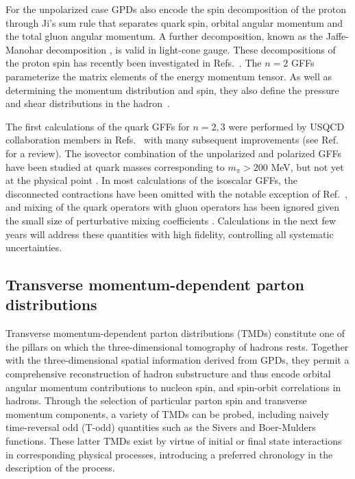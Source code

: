 For the unpolarized case
GPDs also encode the spin decomposition of the proton through Ji's sum rule \cite{Ji:1996ek} that separates quark spin, orbital angular momentum and the total gluon angular momentum. 
A further decomposition, known as the Jaffe-Manohar decomposition \cite{Jaffe:1989jz}, is valid in light-cone gauge. These decompositions of the proton spin has recently been investigated in Refs.~\cite{Yang:2016plb,Alexandrou:2017oeh}.
The $n=2$ GFFs  parameterize the matrix elements of the energy momentum tensor. As well as determining the momentum distribution and spin, they 
also define the pressure and shear distributions in the hadron~\cite{Polyakov:2018zvc}.

The first calculations of the quark GFFs for $n=2,3$ were performed by USQCD collaboration members in Refs.~\cite{Hagler:2003jd} with many subsequent improvements (see Ref.~\cite{Hagler:2009mb} for a review). The isovector combination of the unpolarized and polarized GFFs have been studied at quark masses corresponding to $m_\pi>200$ MeV, but not yet at the physical point \cite{Syritsyn:2011vk,Bali:2013dpa,Hagler:2007xi,Bratt:2010jn,Sternbeck:2012rw,Brommel:2007sb,Gockeler:2003jfa,Alexandrou:2011nr}. In most calculations of the isoscalar GFFs, the disconnected contractions have been omitted with the notable exception of Ref.~\cite{Deka:2013zha}, and mixing of the quark operators with gluon operators has been ignored given the small size of perturbative mixing coefficients \cite{Alexandrou:2016ekb}.  Calculations in the next few years will address these quantities with high fidelity, controlling all systematic uncertainties.

\subsection{Transverse momentum-dependent parton distributions}
\label{TMDs}

Transverse momentum-dependent parton distributions (TMDs) \cite{Boer:2011fh}
constitute one of the pillars on which the three-dimensional tomography of
hadrons rests. Together with the three-dimensional spatial information
derived from GPDs, they permit a
comprehensive reconstruction of hadron substructure and thus
encode 
orbital angular momentum contributions to nucleon spin, and
spin-orbit correlations in hadrons. Through the selection of
particular parton spin and transverse momentum components, a
variety of TMDs can be probed, including naively time-reversal odd
(T-odd) quantities such as the Sivers and Boer-Mulders functions.
These latter TMDs exist by virtue of initial or final state interactions
in corresponding physical processes, introducing a preferred chronology
in the description of the process.

